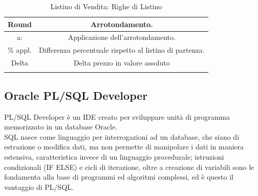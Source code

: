 \begin{longtable}{| c | c |}
	Round & Arrotondamento.\\ \hline    

	a: & Applicazione dell'arrotondamento.\\ \hline    

	\% appl. & Differenza percentuale rispetto al listino di partenza.\\ \hline    

	Delta & Delta prezzo in valore assoluto \\ \hline
	\caption{Listino di Vendita: Righe di Listino}

\end{longtable}
\newpage
\subsection{Oracle PL/SQL Developer}
PL/SQL Developer è un IDE creato per sviluppare unità di programma memorizzato in un database Oracle.\\
SQL nasce come linguaggio per interrogazioni ad un database, che siano di estrazione o modifica dati, ma non permette di manipolare i dati in maniera estensiva, caratteristica invece di un linguaggio procedurale; istruzioni condizionali (IF ELSE) e cicli di iterazione, oltre a creazione di variabili sono le fondamenta alla base di programmi ed algoritmi complessi, ed è questo il vantaggio di PL/SQL.\\
